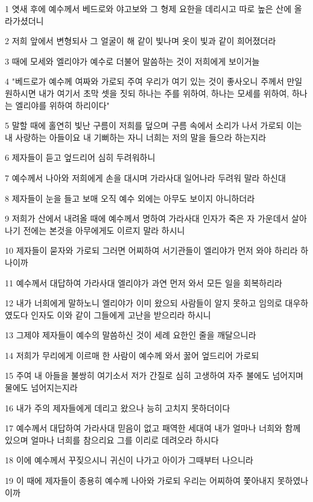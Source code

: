 \par 1 엿새 후에 예수께서 베드로와 야고보와 그 형제 요한을 데리시고 따로 높은 산에 올라가셨더니
\par 2 저희 앞에서 변형되사 그 얼굴이 해 같이 빛나며 옷이 빛과 같이 희어졌더라
\par 3 때에 모세와 엘리야가 예수로 더불어 말씀하는 것이 저희에게 보이거늘
\par 4 "베드로가 예수께 여짜와 가로되 주여 우리가 여기 있는 것이 좋사오니 주께서 만일 원하시면 내가 여기서 초막 셋을 짓되 하나는 주를 위하여, 하나는 모세를 위하여, 하나는 엘리야를 위하여 하리이다"
\par 5 말할 때에 홀연히 빛난 구름이 저희를 덮으며 구름 속에서 소리가 나서 가로되 이는 내 사랑하는 아들이요 내 기뻐하는 자니 너희는 저의 말을 들으라 하는지라
\par 6 제자들이 듣고 엎드리어 심히 두려워하니
\par 7 예수께서 나아와 저희에게 손을 대시며 가라사대 일어나라 두려워 말라 하신대
\par 8 제자들이 눈을 들고 보매 오직 예수 외에는 아무도 보이지 아니하더라
\par 9 저희가 산에서 내려올 때에 예수께서 명하여 가라사대 인자가 죽은 자 가운데서 살아나기 전에는 본것을 아무에게도 이르지 말라 하시니
\par 10 제자들이 묻자와 가로되 그러면 어찌하여 서기관들이 엘리야가 먼저 와야 하리라 하나이까
\par 11 예수께서 대답하여 가라사대 엘리야가 과연 먼저 와서 모든 일을 회복하리라
\par 12 내가 너희에게 말하노니 엘리야가 이미 왔으되 사람들이 알지 못하고 임의로 대우하였도다 인자도 이와 같이 그들에게 고난을 받으리라 하시니
\par 13 그제야 제자들이 예수의 말씀하신 것이 세례 요한인 줄을 깨달으니라
\par 14 저희가 무리에게 이르매 한 사람이 예수께 와서 꿇어 엎드리어 가로되
\par 15 주여 내 아들을 불쌍히 여기소서 저가 간질로 심히 고생하여 자주 불에도 넘어지며 물에도 넘어지는지라
\par 16 내가 주의 제자들에게 데리고 왔으나 능히 고치지 못하더이다
\par 17 예수께서 대답하여 가라사대 믿음이 없고 패역한 세대여 내가 얼마나 너희와 함께 있으며 얼마나 너희를 참으리요 그를 이리로 데려오라 하시다
\par 18 이에 예수께서 꾸짖으시니 귀신이 나가고 아이가 그때부터 나으니라
\par 19 이 때에 제자들이 종용히 예수께 나아와 가로되 우리는 어찌하여 쫓아내지 못하였나이까

